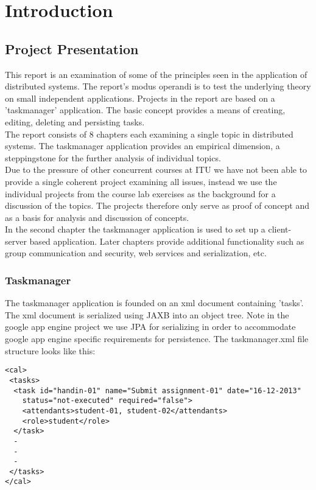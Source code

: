 \chapter{Introduction}
\minitoc

\section{Project Presentation}

This report is an examination of some of the principles seen in the application of distributed systems. The report's modus operandi is to test the underlying theory on small independent applications. Projects in the report are based on a 'taskmanager' application. The basic concept provides a means of creating, editing, deleting and persisting tasks. \\

The report consists of 8 chapters each examining a single topic in distributed systems. The taskmanager application provides an empirical dimension, a steppingstone for the further analysis of individual topics. \\

Due to the pressure of other concurrent courses at ITU we have not been able to provide a single coherent project examining all issues, instead we use the individual projects from the course lab exercises as the background for a discussion of the topics. The projects therefore only serve as proof of concept and as a basis for analysis and discussion of concepts.  \\

In the second chapter the taskmanager application is used to set up a client-server based application. Later chapters provide additional functionality such as group communication and security, web services and serialization, etc. \\

\begin{comment}
The idea is to try out some of the techniques commonly seen in the implementation of distributed systems and thereby demonstrate our understanding of the theories behind, as well as (some of), the challenges faced by distributed systems. 
\end{comment}

\subsection{Taskmanager}

The taskmanager application is founded on an xml document containing 'tasks'. The xml document is serialized using JAXB into an object tree. Note in the google app engine project we use JPA for serializing in order to accommodate google app engine specific requirements for persistence. The taskmanager.xml file structure looks like this:
\pagebreak
\begin{lstlisting}[caption = taskmanager.xml]
<cal>
 <tasks>
  <task id="handin-01" name="Submit assignment-01" date="16-12-2013"
	status="not-executed" required="false">
	<attendants>student-01, student-02</attendants>
	<role>student</role>	
  </task>
  - 
  - 
  - 
 </tasks>
</cal>
\end{lstlisting}

